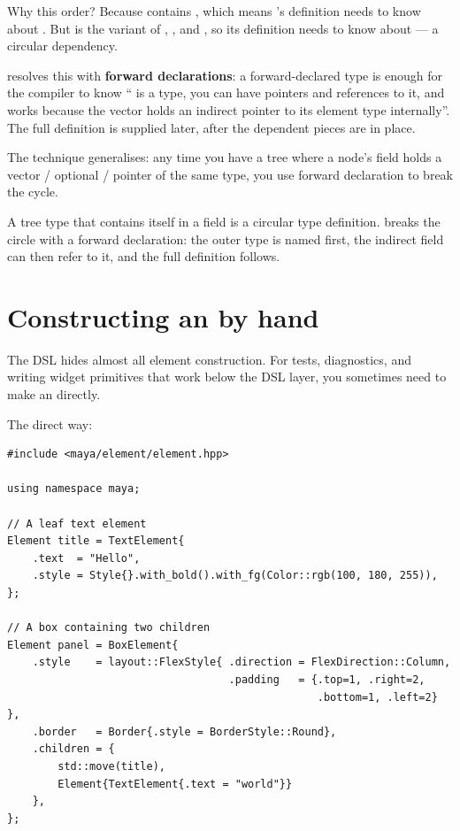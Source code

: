 Why this order? Because  contains
, which means 's
definition needs to know about . But  is
the variant of , , and
, so its definition needs to know about
 --- a circular dependency.

\cpp{} resolves this with \textbf{forward declarations}: a
forward-declared type is enough for the compiler to know
`` is a type, you can have pointers and references to
it, and  works because the vector holds
an indirect pointer to its element type internally''. The full
definition is supplied later, after the dependent pieces are in
place.

The technique generalises: any time you have a tree where a node's
field holds a vector / optional / pointer of the same type, you
use forward declaration to break the cycle.

\begin{idea}
A tree type that contains itself in a field is a circular type
definition. \cpp{} breaks the circle with a forward declaration:
the outer type is named first, the indirect field can then refer to
it, and the full definition follows.
\end{idea}

\section{Constructing an  by hand}
\label{sec:elem:by-hand}

The DSL hides almost all element construction. For tests,
diagnostics, and writing widget primitives that work below the DSL
layer, you sometimes need to make an  directly.

The direct way:

\begin{lstlisting}
#include <maya/element/element.hpp>

using namespace maya;

// A leaf text element
Element title = TextElement{
    .text  = "Hello",
    .style = Style{}.with_bold().with_fg(Color::rgb(100, 180, 255)),
};

// A box containing two children
Element panel = BoxElement{
    .style    = layout::FlexStyle{ .direction = FlexDirection::Column,
                                   .padding   = {.top=1, .right=2,
                                                 .bottom=1, .left=2} },
    .border   = Border{.style = BorderStyle::Round},
    .children = {
        std::move(title),
        Element{TextElement{.text = "world"}}
    },
};
\end{lstlisting}

